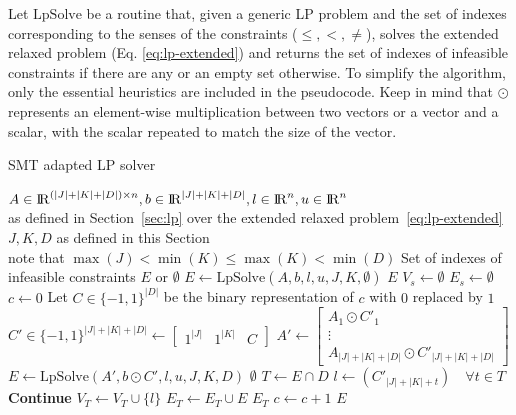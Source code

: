 \documentclass[runningheads]{llncs}
\begin{document}
Let $\text{LpSolve}$ be a routine that, given a generic LP problem and the set of indexes corresponding to the senses of the constraints ($\le, <, \ne$), solves the extended relaxed problem (Eq. \eqref{eq:lp-extended}) and returns the set of indexes of infeasible constraints if there are any or an empty set otherwise.
To simplify the algorithm, only the essential heuristics are included in the pseudocode.
Keep in mind that $\odot$ represents an element-wise multiplication between two vectors or a vector and a scalar, with the scalar repeated to match the size of the vector.
\begin{algorithm}
    \caption{SMT adapted LP solver}\label{alg:theory-solver}
    \begin{algorithmic}
        \Require $A \in {\rm I\!R}^{(|J| + |K| + |D|) \times n}, b \in {\rm I\!R}^{|J| + |K| + |D|}, l \in {\rm I\!R}^n, u \in {\rm I\!R}^n$ \\
        \qquad as defined in Section~\ref{sec:lp} over the extended relaxed problem~\eqref{eq:lp-extended}
        \Require $J, K, D$ as defined in this Section \\
        \qquad note that $\max(J) < \min(K) \le \max(K) < \min(D)$
        \Ensure Set of indexes of infeasible constraints $E$ or $\emptyset$
        \State $E \gets \text{LpSolve}(A, b, l, u, J, K, \emptyset)$ 
        \State \Return $E$
        \EndIf
        \State $V_s \gets \emptyset$
        \State $E_s \gets \emptyset$
        \EndFor
        \State $c \gets 0$ 
        \State Let $C \in \{-1, 1\}^{|D|}$ be the binary representation of $c$ with $0$ replaced by $1$
        \State $C' \in \{-1, 1\}^{|J|+|K|+|D|} \gets \begin{bmatrix} 1^{|J|} & 1^{|K|} & C\end{bmatrix}$
        \State $A' \gets \begin{bmatrix}A_1 \odot C'_1 \\ \vdots \\ A_{|J|+|K|+|D|} \odot C'_{|J|+|K|+|D|}\end{bmatrix}$
        \State $E \gets \text{LpSolve}(A', b \odot C', l, u, J, K, D)$
         
        \State \Return $\emptyset$
        \EndIf
        \State $T \gets E \cap D$
        \State $l \gets (C'_{|J| + |K| + t}) \quad \forall t \in T$ %
         
        \State \textbf{Continue}
        \EndIf
        \State $V_T \gets V_T \cup \{l\}$
        \State $E_T \gets E_T \cup E$
         
        \State \Return $E_T$
        \EndIf
        \State $c \gets c + 1$
        \EndWhile
        \State \Return $E$
    \end{algorithmic}
\end{algorithm}
\end{document}

